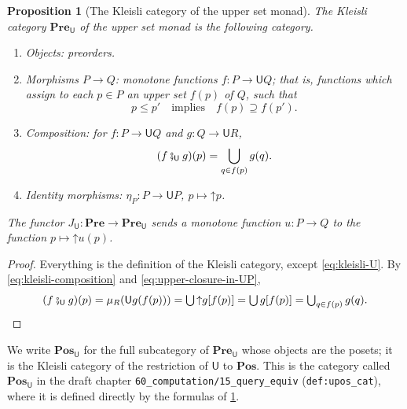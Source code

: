 \documentclass[11pt,a4paper]{article}
\theoremstyle{plain}
\newtheorem{proposition}[theorem]{Proposition}
\theoremstyle{definition}
\theoremstyle{remark}
\newcommand{\Cat}[1]{\mathbf{#1}}
\newcommand{\Pre}{\Cat{Pre}}
\newcommand{\Pos}{\Cat{Pos}}
\newcommand{\U}{\mathsf{U}}
\newcommand{\PreU}{\Pre_{\U}}
\newcommand{\PosU}{\Pos_{\U}}
\newcommand{\thenU}{\mathbin{\fatsemi_{\U}}}
\newcommand{\up}{\mathord{\uparrow}}
\newcommand{\lbl}[1]{\nolinkurl{#1}}
\newcommand{\file}[1]{\nolinkurl{#1}}
\begin{document}
\begin{proposition}[The Kleisli category of the upper set monad]
    \label{prop:kleisli-U}
    The Kleisli category $\PreU$ of the upper set monad is the following category.
    \begin{enumerate}
        \item Objects: preorders.
        \item Morphisms $P \to Q$: monotone functions $f \colon P \to \U Q$; that is, functions which assign to each $p \in P$ an upper set $f(p)$ of $Q$, such that
              \begin{equation}
                  \label{eq:kleisli-antitone}
                  p \leq p' \quad \text{implies} \quad f(p) \supseteq f(p').
              \end{equation}
        \item Composition: for $f \colon P \to \U Q$ and $g \colon Q \to \U R$,
              \begin{equation}
                  \label{eq:kleisli-U}
                  (f \thenU g)(p) = \bigcup_{q \in f(p)} g(q).
              \end{equation}
        \item Identity morphisms: $\eta_P \colon P \to \U P$, $p \mapsto \up p$.
    \end{enumerate}
    The functor $J_{\U} \colon \Pre \to \PreU$ sends a monotone function $u \colon P \to Q$ to the function $p \mapsto \up u(p)$.
\end{proposition}
\begin{proof}
    Everything is the definition of the Kleisli category, except \cref{eq:kleisli-U}.
    By \cref{eq:kleisli-composition} and \cref{eq:upper-closure-in-UP},
    \begin{equation*}
        (f \thenU g)(p) = \mu_R(\U g(f(p))) = \textstyle\bigcup \up g[f(p)] = \bigcup g[f(p)] = \bigcup_{q \in f(p)} g(q). \qedhere
    \end{equation*}
\end{proof}

We write $\PosU$ for the full subcategory of $\PreU$ whose objects are the posets; it is the Kleisli category of the restriction of $\U$ to $\Pos$.
This is the category called $\Cat{Pos}_{\U}$ in the draft chapter \file{60_computation/15_query_equiv} (\lbl{def:upos_cat}), where it is defined directly by the formulas of \cref{prop:kleisli-U}.
\end{document}

